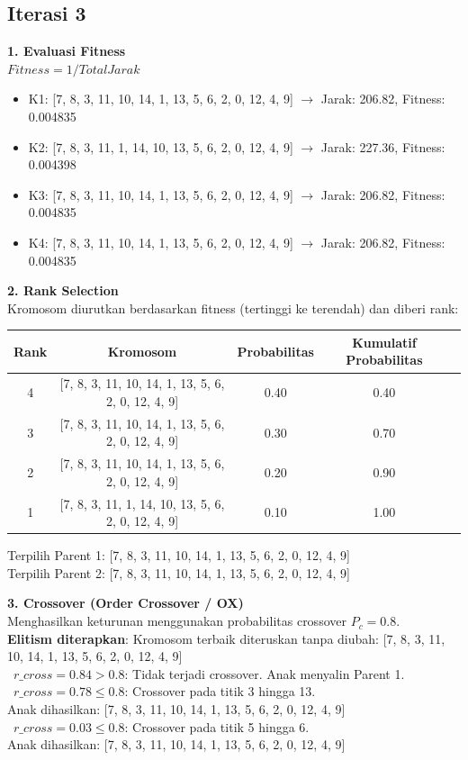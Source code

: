 \documentclass[12pt]{article}
\begin{document}
\subsection*{Iterasi 3}
\textbf{1. Evaluasi Fitness}\\$Fitness = 1 / Total Jarak$
\begin{itemize}
\item K1: [7, 8, 3, 11, 10, 14, 1, 13, 5, 6, 2, 0, 12, 4, 9] $\rightarrow$ Jarak: 206.82, Fitness: 0.004835
\item K2: [7, 8, 3, 11, 1, 14, 10, 13, 5, 6, 2, 0, 12, 4, 9] $\rightarrow$ Jarak: 227.36, Fitness: 0.004398
\item K3: [7, 8, 3, 11, 10, 14, 1, 13, 5, 6, 2, 0, 12, 4, 9] $\rightarrow$ Jarak: 206.82, Fitness: 0.004835
\item K4: [7, 8, 3, 11, 10, 14, 1, 13, 5, 6, 2, 0, 12, 4, 9] $\rightarrow$ Jarak: 206.82, Fitness: 0.004835
\end{itemize}
\vspace{0.5cm}\textbf{2. Rank Selection}\\Kromosom diurutkan berdasarkan fitness (tertinggi ke terendah) dan diberi rank:
\begin{table}[h!]\centering\begin{tabular}{ccccc}\toprule Rank & Kromosom & Probabilitas & Kumulatif Probabilitas \\ \midrule
4 & [7, 8, 3, 11, 10, 14, 1, 13, 5, 6, 2, 0, 12, 4, 9] & 0.40 & 0.40 \\
3 & [7, 8, 3, 11, 10, 14, 1, 13, 5, 6, 2, 0, 12, 4, 9] & 0.30 & 0.70 \\
2 & [7, 8, 3, 11, 10, 14, 1, 13, 5, 6, 2, 0, 12, 4, 9] & 0.20 & 0.90 \\
1 & [7, 8, 3, 11, 1, 14, 10, 13, 5, 6, 2, 0, 12, 4, 9] & 0.10 & 1.00 \\
\bottomrule\end{tabular}\end{table}
Terpilih Parent 1: [7, 8, 3, 11, 10, 14, 1, 13, 5, 6, 2, 0, 12, 4, 9]\\
Terpilih Parent 2: [7, 8, 3, 11, 10, 14, 1, 13, 5, 6, 2, 0, 12, 4, 9]
\vspace{0.5cm}

\vspace{0.5cm}
\noindent\textbf{3. Crossover (Order Crossover / OX)}\\Menghasilkan keturunan menggunakan probabilitas crossover $P_c = 0.8$.\\
\textbf{Elitism diterapkan}: Kromosom terbaik diteruskan tanpa diubah: [7, 8, 3, 11, 10, 14, 1, 13, 5, 6, 2, 0, 12, 4, 9]\\
\textbullet\ $r\_cross = 0.84 > 0.8$: Tidak terjadi crossover. Anak menyalin Parent 1.\\
\textbullet\ $r\_cross = 0.78 \le 0.8$: Crossover pada titik 3 hingga 13.\\ Anak dihasilkan: [7, 8, 3, 11, 10, 14, 1, 13, 5, 6, 2, 0, 12, 4, 9]\\
\textbullet\ $r\_cross = 0.03 \le 0.8$: Crossover pada titik 5 hingga 6.\\ Anak dihasilkan: [7, 8, 3, 11, 10, 14, 1, 13, 5, 6, 2, 0, 12, 4, 9]\\
\end{document}
